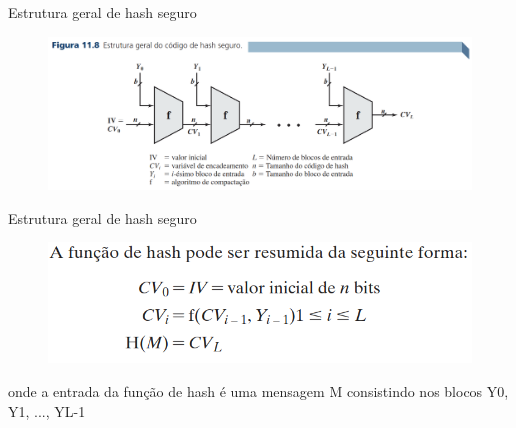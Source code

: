 \begin{frame}{Estrutura geral de hash seguro}
    \begin{figure}
        \centering
        \includegraphics[width=0.9\linewidth]{Figuras/estrutura-gera-hash-seguro.png}
    \end{figure}
\end{frame}

\begin{frame}{Estrutura geral de hash seguro}
    \begin{figure}
        \centering
        \includegraphics[width=0.9\linewidth]{Figuras/pode-ser-resumida-seg-forma.png}
    \end{figure}
    onde a entrada da função de hash é uma mensagem M consistindo nos blocos Y0, Y1, ..., YL-1
\end{frame}

